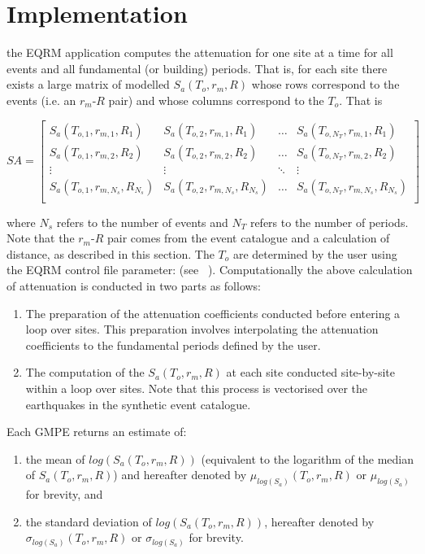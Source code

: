 \section{Implementation}\label{sec:implementation} the EQRM
application computes the attenuation for one site at a time for all
events and all fundamental (or building) periods. That is, for each
site there exists a large matrix of modelled $S_a(T_o,r_m,R)$ whose
rows correspond to the events (i.e. an $r_m$-$R$ pair) and whose
columns correspond to the $T_o$. That is

\begin{math}
 SA = \left[ \begin{array}{ccccc}
S_a(T_{o,1},r_{m,1},R_1) & S_a(T_{o,2},r_{m,1},R_1) &  \hdots & S_a(T_{o,N_T},r_{m,1},R_1) \\
S_a(T_{o,1},r_{m,2},R_2) & S_a(T_{o,2},r_{m,2},R_2) &  \hdots & S_a(T_{o,N_T},r_{m,2},R_2) \\
\vdots & \vdots &  \ddots & \vdots \\
S_a(T_{o,1},r_{m,N_s},R_{N_s}) & S_a(T_{o,2},r_{m,N_s},R_{N_s}) & \hdots & S_a(T_{o,N_T},r_{m,N_s},R_{N_s}) \\
\end{array} \right]
\end{math}

where $N_s$ refers to the number of events and $N_T$ refers to the
number of periods. Note that the $r_m$-$R$ pair comes from the event
catalogue and a calculation of distance, as described in this
section. The $T_o$ are determined by the user using the EQRM control
file parameter:  (see
~). Computationally the above
calculation of attenuation is conducted in two parts as follows:
\begin{enumerate}
\item The preparation of the attenuation coefficients
conducted before entering a loop over sites. This preparation
involves interpolating the attenuation coefficients to the
fundamental periods defined by the user. \item The computation of
the $S_a(T_o,r_m,R)$ at each site conducted site-by-site within a
loop over sites. Note that this process is vectorised over the
earthquakes in the synthetic event catalogue.
\end{enumerate}


Each GMPE returns an estimate of:
\begin{enumerate}
\item the mean of $log(S_a(T_o,r_m,R))$ (equivalent to the
logarithm of the median of $S_a(T_o,r_m,R)$) and hereafter denoted
by $\mu_{log(S_a)}(T_o,r_m,R)$ or $\mu_{log(S_a)}$ for brevity, and
\item the standard deviation of $log(S_a(T_o,r_m,R))$, hereafter
denoted by \newline $\sigma_{log(S_a)}(T_o,r_m,R)$ or
$\sigma_{log(S_a)}$ for brevity.
\end{enumerate}


